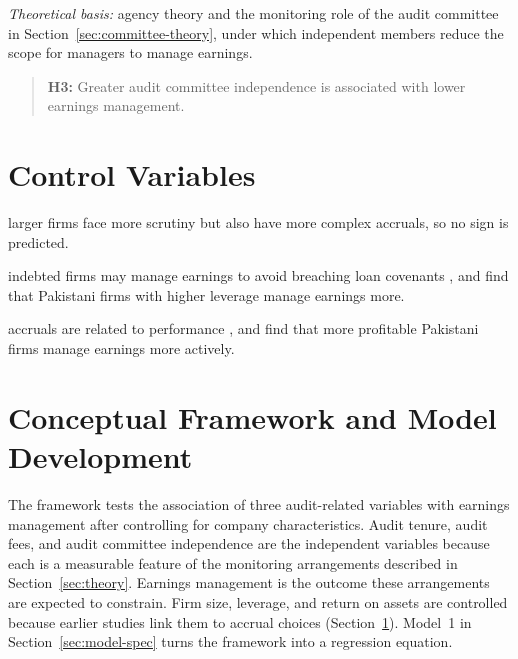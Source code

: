 \emph{Theoretical basis:} agency theory and the monitoring role of the audit committee in Section~\ref{sec:committee-theory}, under which independent members reduce the scope for managers to manage earnings.

\begin{quote}
  \textbf{H3:} Greater audit committee independence is associated with lower earnings management.
\end{quote}

\section{Control Variables}
\label{sec:controls}

\begin{description}[leftmargin=0pt,labelindent=0pt,style=unboxed]
  \item[Firm size:] larger firms face more scrutiny but also have more complex accruals, so no sign is predicted.
  \item[Leverage:] indebted firms may manage earnings to avoid breaching loan covenants \parencite{defond1994}, and \textcite{kamran2014} find that Pakistani firms with higher leverage manage earnings more.
  \item[Return on assets:] accruals are related to performance \parencite{kothari2005}, and \textcite{kamran2014} find that more profitable Pakistani firms manage earnings more actively.
\end{description}

\section{Conceptual Framework and Model Development}

The framework tests the association of three audit-related variables with earnings management after controlling for company characteristics. Audit tenure, audit fees, and audit committee independence are the independent variables because each is a measurable feature of the monitoring arrangements described in Section~\ref{sec:theory}. Earnings management is the outcome these arrangements are expected to constrain. Firm size, leverage, and return on assets are controlled because earlier studies link them to accrual choices (Section~\ref{sec:controls}). Model~1 in Section~\ref{sec:model-spec} turns the framework into a regression equation.

